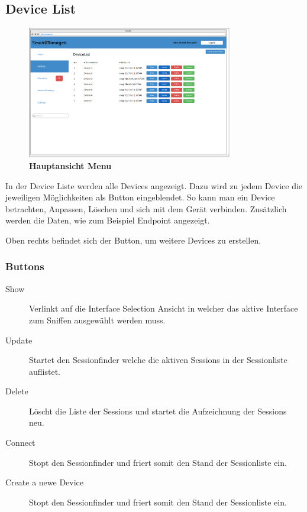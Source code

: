 \subsection{Device List}
\begin{figure} [H]
	\begin{center}
	\includegraphics[width=0.80\textwidth]{images/devicelist.png}
	\caption{\textbf{Hauptansicht Menu}}
	\label{Device List}
	\end{center}
\end{figure}
In der Device Liste werden alle Devices angezeigt. Dazu wird zu jedem Device die jeweiligen Möglichkeiten als Button eingeblendet. So kann man ein Device betrachten, Anpassen, Löschen und sich mit dem Gerät verbinden. Zusätzlich werden die Daten, wie zum Beispiel Endpoint angezeigt.

Oben rechts befindet sich der Button, um weitere Devices zu erstellen.
\subsubsection{Buttons}

\begin{description}
\item [Show]
Verlinkt auf die \grqq{}Interface Selection\grqq{} Ansicht in welcher das aktive Interface zum Sniffen ausgewählt werden muss.
\item [Update]
Startet den Sessionfinder welche die aktiven Sessions in der Sessionliste auflistet.
\item [Delete]
Löscht die Liste der Sessions und startet die Aufzeichnung der Sessions neu.
\item [Connect]
Stopt den Sessionfinder und friert somit den Stand der Sessionliste ein.
\item [Create a newe Device]
Stopt den Sessionfinder und friert somit den Stand der Sessionliste ein.
\end{description}





